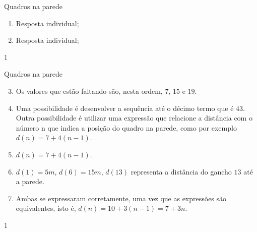 \begin{answer}{Quadros na parede}
{
\begin{enumerate}
\item Resposta individual;
\item Resposta individual;
\end{enumerate}
}{1}
\end{answer}
\clearmargin
\begin{answer}{Quadros na parede}
{
\begin{enumerate}\setcounter{enumi}{2}
\item Os valores que estão faltando são, nesta ordem, $7$, $15$ e $19$.
\item Uma possibilidade é desenvolver a sequência até o décimo termo que é $43$. Outra possibilidade é utilizar uma expressão que relacione a distância com o número n que indica a posição do quadro na parede, como por exemplo $d(n)=7+4(n-1)$.
\item $d(n)=7+4(n-1).$
\item $d(1)=5m$, $d(6)=15m$, $d(13)$ representa a distância do gancho $13$ até a parede.
\item Ambas se expressaram corretamente, uma vez que as expressões são equivalentes, isto é, $d(n)=10+3(n-1)=7+3n$.  
\end{enumerate}
}{1}
\end{answer}


